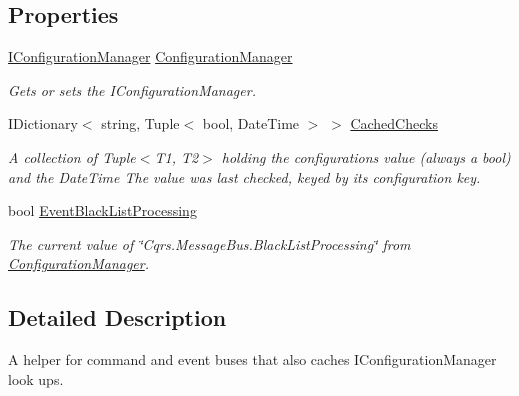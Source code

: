 \subsection*{Properties}
\begin{DoxyCompactItemize}
\item 
\hyperlink{interfaceCqrs_1_1Configuration_1_1IConfigurationManager}{I\+Configuration\+Manager} \hyperlink{classCqrs_1_1Bus_1_1BusHelper_aff0eaa0679d808e268ab4b5fb669bac8_aff0eaa0679d808e268ab4b5fb669bac8}{Configuration\+Manager}
\begin{DoxyCompactList}\small\item\em Gets or sets the I\+Configuration\+Manager. \end{DoxyCompactList}\item 
I\+Dictionary$<$ string, Tuple$<$ bool, Date\+Time $>$ $>$ \hyperlink{classCqrs_1_1Bus_1_1BusHelper_ae29e80bd315b6284509c9fd0b977d2a0_ae29e80bd315b6284509c9fd0b977d2a0}{Cached\+Checks}
\begin{DoxyCompactList}\small\item\em A collection of Tuple$<$\+T1, T2$>$ holding the configurations value (always a bool) and the Date\+Time The value was last checked, keyed by it\textquotesingle{}s configuration key. \end{DoxyCompactList}\item 
bool \hyperlink{classCqrs_1_1Bus_1_1BusHelper_ae8d3525369ee9572de06f935cc09510b_ae8d3525369ee9572de06f935cc09510b}{Event\+Black\+List\+Processing}
\begin{DoxyCompactList}\small\item\em The current value of \char`\"{}\+Cqrs.\+Message\+Bus.\+Black\+List\+Processing\char`\"{} from \hyperlink{classCqrs_1_1Bus_1_1BusHelper_aff0eaa0679d808e268ab4b5fb669bac8_aff0eaa0679d808e268ab4b5fb669bac8}{Configuration\+Manager}. \end{DoxyCompactList}\end{DoxyCompactItemize}


\subsection{Detailed Description}
A helper for command and event buses that also caches I\+Configuration\+Manager look ups. 



